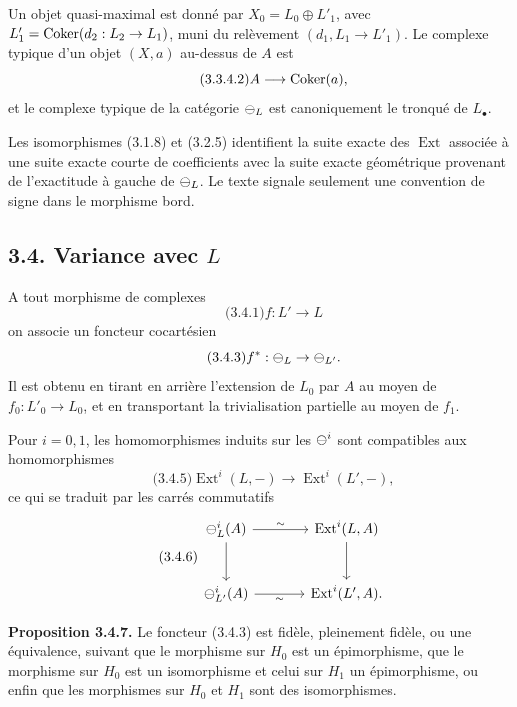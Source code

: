 \documentclass[11pt]{article}
\providecommand{\Ext}{\operatorname{Ext}}
\begin{document}
Un objet quasi-maximal est donn\'e par \(X_0=L_0\oplus L'_1\), avec \(L'_1=\operatorname{Coker}(d_2:L_2\to L_1)\), muni du rel\`evement \((d_1,L_1\to L'_1)\).  Le complexe typique d'un objet \((X,a)\) au-dessus de \(A\) est
\begin{equation}\qquad\text{(3.3.4.2)}
  A\longrightarrow\operatorname{Coker}(a),
\end{equation}
et le complexe typique de la cat\'egorie \(\mathcal\Psi_L\) est canoniquement le tronqu\'e de \(L_\bullet\).

Les isomorphismes (3.1.8) et (3.2.5) identifient la suite exacte des \(\Ext\) associ\'ee \`a une suite exacte courte de coefficients avec la suite exacte g\'eom\'etrique provenant de l'exactitude \`a gauche de \(\mathcal\Psi_L\).  Le texte signale seulement une convention de signe dans le morphisme bord.

\subsection*{3.4. Variance avec \(L\)}
A tout morphisme de complexes
\begin{equation}\qquad\text{(3.4.1)}
  f:L'\to L
\end{equation}
on associe un foncteur cocart\'esien
\begin{equation}\qquad\text{(3.4.3)}
  f^*:\mathcal\Psi_L\to\mathcal\Psi_{L'}.
\end{equation}
Il est obtenu en tirant en arri\`ere l'extension de \(L_0\) par \(A\) au moyen de \(f_0:L'_0\to L_0\), et en transportant la trivialisation partielle au moyen de \(f_1\).

Pour \(i=0,1\), les homomorphismes induits sur les \(\mathcal\Psi^i\) sont compatibles aux homomorphismes
\begin{equation}\qquad\text{(3.4.5)}
  \Ext^i(L,-)\to\Ext^i(L',-),
\end{equation}
ce qui se traduit par les carr\'es commutatifs
\begin{equation}\qquad\text{(3.4.6)}
\begin{tikzcd}[column sep=large,row sep=large]
\cPsi_L^i(A)\arrow[r,"\sim"]\arrow[d]&\Ext^i(L,A)\arrow[d]\\
\cPsi_{L'}^i(A)\arrow[r,"\sim"']&\Ext^i(L',A).
\end{tikzcd}
\end{equation}

\textbf{Proposition 3.4.7.}  Le foncteur (3.4.3) est fid\`ele, pleinement fid\`ele, ou une équivalence, suivant que le morphisme sur \(H_0\) est un \'epimorphisme, que le morphisme sur \(H_0\) est un isomorphisme et celui sur \(H_1\) un épimorphisme, ou enfin que les morphismes sur \(H_0\) et \(H_1\) sont des isomorphismes.
\end{document}
